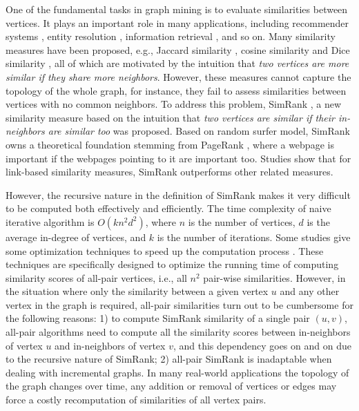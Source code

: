 \documentclass[conference]{IEEEtran}
\theoremstyle{definition}
\theoremstyle{definition}
\begin{document}
One of the fundamental tasks in graph mining is to evaluate similarities between vertices. 
It plays an important role in many applications, including recommender systems \cite{fouss2007random}, entity resolution \cite{bhattacharya2006entity}, information retrieval \cite{dean1999finding}, and so on. 
Many similarity measures have been proposed, e.g., Jaccard similarity \cite{jaccard1901etude}, cosine similarity \cite{baeza1999modern} and Dice similarity \cite{dice1945measures}, all of which are motivated by the intuition that {\em two vertices are more similar if they share more neighbors}. 
However, these measures cannot capture the topology of the whole graph, for instance, they fail to assess similarities between vertices with no common neighbors.
 To address this problem, SimRank \cite{jeh2002simrank}, a new similarity measure based on the intuition that {\em two vertices are similar if their in-neighbors are similar too} was proposed. 
Based on random surfer model, SimRank owns a theoretical foundation stemming from PageRank \cite{page1999pagerank}, where a webpage is important if the webpages pointing to it are important too. 
Studies show that for link-based similarity measures, SimRank outperforms other related measures. 

However, the recursive nature in the definition of SimRank makes it very difficult to be computed both effectively and efficiently. 
The time complexity of naive iterative algorithm is $O({k}{n}^{2}{d}^{2})$, where $n$ is the number of vertices, $d$ is the average in-degree of vertices, and $k$ is the number of iterations.
 Some studies give some optimization techniques to speed up the computation process \cite{lizorkin2008accuracy}\cite{yu2012space}.
 These techniques are specifically designed to optimize the running time of computing similarity scores of all-pair vertices, i.e., all $n^2$ pair-wise similarities.
 However, in the situation where only the similarity between a given vertex $u$ and any other vertex in the graph is required, all-pair similarities turn out to be cumbersome for the following reasons: 
1) to compute SimRank similarity of a single pair $(u, v)$,  all-pair algorithms need to compute all the similarity scores between in-neighbors of vertex $u$ and in-neighbors of vertex $v$, and this dependency goes on and on due to the recursive nature of SimRank; 
2) all-pair SimRank is inadaptable when dealing with incremental graphs. 
In many real-world applications the topology of the graph changes over time, any addition or removal of vertices or edges may force a costly recomputation of similarities of all vertex pairs. 
\end{document}
